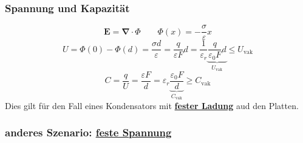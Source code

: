 \documentclass[titlepage,11pt,a4paper,ngerman]{report}
\newcommand{\tx}[1]{\textrm{#1}}
\newcommand{\ul}[1]{\underline{#1}}
\newcommand{\ub}[1]{\underbrace{#1}}
\renewcommand{\Phi}{\varPhi}
\renewcommand{\vec}[1]{\boldsymbol{#1}}
\newcommand{\lcom}[1]{\color{MidnightBlue}#1\color{black}}
\renewcommand{\epsilon}{\varepsilon}
\newcommand{\vabla}{\boldsymbol{\nabla}}
\begin{document}
\subsubsection{Spannung und Kapazität}

\begin{equation*}
\vec{E} = \vabla \cdot \Phi \qquad \Phi(x) = - \frac{\sigma}{\epsilon} x
\end{equation*}
\begin{equation*}
U = \Phi(0) - \Phi(d) = \frac{\sigma d}{\epsilon} = \frac{q}{\epsilon F} d = \frac{1}{\epsilon_r} \ub{\frac{q}{\epsilon_0 F} d}_{U_{\tx{vak}}} \le U_{\tx{vak}}
\end{equation*}
\begin{equation*}
C = \frac{q}{U} = \frac{\epsilon F}{d} = \epsilon_r \ub{\frac{\epsilon_0 F}{d}}_{C_\tx{vak}} \ge C_{\tx{vak}}
\end{equation*}
\lcom{Dies gilt für den Fall eines Kondensators mit \textbf{\ul{fester Ladung}} aud den Platten.}

\subsubsection{anderes Szenario: \ul{feste Spannung}}
\end{document}
